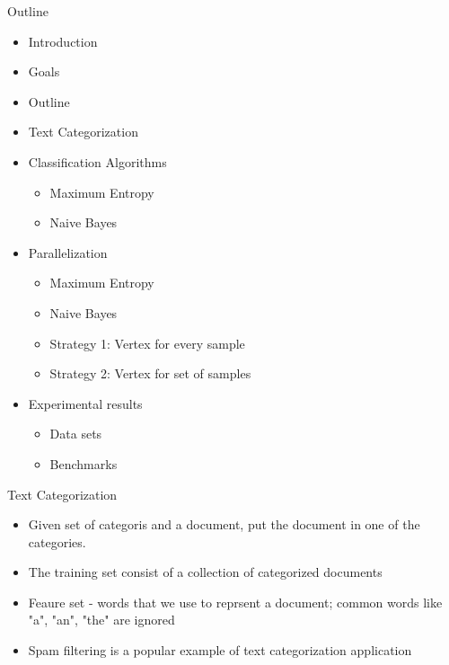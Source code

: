 \documentclass{beamer}
\begin{document}
\begin{frame}{Outline}

\begin{itemize}
 \item Introduction
 \item Goals
 \item Outline
 \item Text Categorization
 \item Classification Algorithms
	\begin{itemize}
	\item  Maximum Entropy
	\item  Naive Bayes
	\end{itemize}
 \item Parallelization
	\begin{itemize}
	\item  Maximum Entropy
	\item  Naive Bayes
	\item  Strategy 1: Vertex for every sample
	\item  Strategy 2: Vertex for set of samples
	\end{itemize}
 \item Experimental results
	\begin{itemize}
	\item Data sets
	\item Benchmarks
	\end{itemize}
\end{itemize}

\end{frame}


\begin{frame}{Text Categorization}

\begin{itemize}
 \item Given set of categoris and a document, put the document in one of the categories.
 \item The training set consist of a collection of categorized documents
 \item Feaure set - words that we use to reprsent a document; common words like "a", "an", "the" are ignored
\item Spam filtering is a popular example of text categorization application
\end{itemize}

\end{frame}
\end{document}
